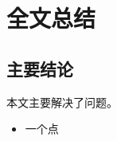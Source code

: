 \newpage
{}
\section{全文总结}\label{sec:conclusion}

\subsection{主要结论}

本文主要解决了问题。

\begin{itemize}
    \item 一个点
\end{itemize}